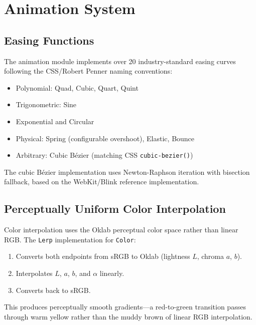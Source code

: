 \documentclass[11pt, a4paper, twocolumn]{article}
\begin{document}
\section{Animation System}
\label{sec:animation}

\subsection{Easing Functions}

The animation module implements over 20 industry-standard easing curves following the CSS/Robert Penner naming conventions:

\begin{itemize}[leftmargin=1.2em, itemsep=0.05em]
    \item Polynomial: Quad, Cubic, Quart, Quint
    \item Trigonometric: Sine
    \item Exponential and Circular
    \item Physical: Spring (configurable overshoot), Elastic, Bounce
    \item Arbitrary: Cubic B\'{e}zier (matching CSS \texttt{cubic-bezier()})
\end{itemize}

The cubic B\'{e}zier implementation uses Newton-Raphson iteration with bisection fallback, based on the WebKit/Blink reference implementation.

\subsection{Perceptually Uniform Color Interpolation}

Color interpolation uses the Oklab perceptual color space rather than linear RGB.
The \texttt{Lerp} implementation for \texttt{Color}:

\begin{enumerate}[leftmargin=1.5em, itemsep=0.1em]
    \item Converts both endpoints from sRGB to Oklab (lightness $L$, chroma $a$, $b$).
    \item Interpolates $L$, $a$, $b$, and $\alpha$ linearly.
    \item Converts back to sRGB.
\end{enumerate}

This produces perceptually smooth gradients---a red-to-green transition passes through warm yellow rather than the muddy brown of linear RGB interpolation.
\end{document}
